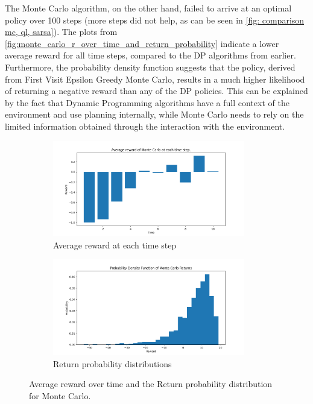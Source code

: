 \documentclass{class}
\begin{document}
\noindent The Monte Carlo algorithm, on the other hand, failed to arrive at an optimal policy over 100 steps (more steps did not help, as can be seen in \autoref{fig: comparison mc, ql, sarsa}). The plots from \autoref{fig:monte_carlo_r_over_time_and_return_probability} indicate a lower average reward for all time steps, compared to the DP algorithms from earlier. Furthermore, the probability density function suggests that the policy, derived from First Visit Epsilon Greedy Monte Carlo, results in a much higher likelihood of returning a negative reward than any of the DP policies. This can be explained by the fact that Dynamic Programming algorithms have a full context of the environment and use planning internally, while Monte Carlo needs to rely on the limited information obtained through the interaction with the environment.

\begin{figure}[H]
    \centering
    \begin{subfigure}[t]{0.47\linewidth}
        \centering
        \includegraphics[height=4.2cm]{plots/r_over_time/monte_carlo_r_over_time.png}
        \caption{Average reward at each time step}
        \label{fig:monte_carlo_r_over_time}
    \end{subfigure}
    \begin{subfigure}[t]{0.47\linewidth}
        \centering
        \includegraphics[height=4.2cm]{plots/return_probability/monte_carlo_return_probability.png}
        \caption{Return probability distributions}
        \label{fig:monte_carlo_return_probability}
    \end{subfigure}
    \caption{Average reward over time and the Return probability distribution for Monte Carlo.}
    \label{fig:monte_carlo_r_over_time_and_return_probability}
\end{figure}
\end{document}
